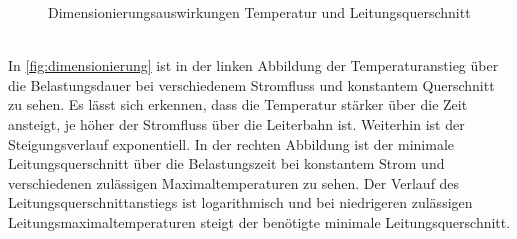 \begin{figure}[h]%
\centering
{}
\caption{Dimensionierungsauswirkungen Temperatur und Leitungsquerschnitt}%
\label{fig:dimensionierung}%
\end{figure}\\
In \autoref{fig:dimensionierung} ist in der linken Abbildung der Temperaturanstieg über die Belastungsdauer bei verschiedenem Stromfluss und konstantem Querschnitt zu sehen. Es lässt sich erkennen, dass die Temperatur stärker über die Zeit ansteigt, je höher der Stromfluss über die Leiterbahn ist. Weiterhin ist der Steigungsverlauf exponentiell. In der rechten Abbildung ist der minimale Leitungsquerschnitt über die Belastungszeit bei konstantem Strom und verschiedenen zulässigen Maximaltemperaturen zu sehen. Der Verlauf des Leitungsquerschnittanstiegs ist logarithmisch und bei niedrigeren zulässigen Leitungsmaximaltemperaturen steigt der benötigte minimale Leitungsquerschnitt. 
